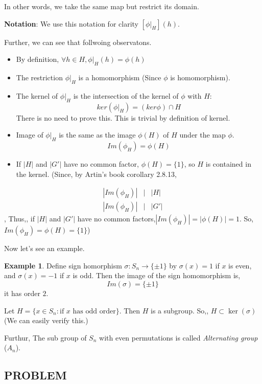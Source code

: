 \documentclass[
]{book}
\providecommand{\tightlist}{%
  \setlength{\itemsep}{0pt}\setlength{\parskip}{0pt}}
\theoremstyle{definition}
\theoremstyle{definition}
\newtheorem{example}{Example}[chapter]
\theoremstyle{definition}
\theoremstyle{definition}
\theoremstyle{remark}
\begin{document}
In other words, we take the same map but restrict its domain.

\textbf{Notation}: We use this notation for clarity \([\phi|_H](h)\).

Further, we can see that follwoing observatons.

\begin{itemize}
\tightlist
\item
  By definition, \(\forall h\in H,\phi|_H(h) = \phi(h)\)
\item
  The restriction \(\phi|_H\) is a homomorphism (Since \(\phi\) is homomorphism).
\item
  The kernel of \(\phi|_H\) is the intersection of the kernel of \(\phi\) with \(H\):
  \[ker(\phi|_H) = (ker\phi) \cap H\]
  There is no need to prove this. This is trivial by definition of kernel.
\item
  Image of \(\phi|_H\) is the same as the image \(\phi(H)\) of \(H\) under the map \(\phi\).
  \[Im(\phi_H)=\phi(H)\]
\item
  If \(|H|\) and \(|G'|\) have no common factor, \(\phi(H) = \{1\}\), so \(H\) is contained in the kernel.
  (Since, by Artin's book corollary 2.8.13,
\end{itemize}

\begin{eqnarray}
|Im(\phi_H)|&\biggr |&|H|\\
|Im(\phi_H)|&\biggr |& |G'|
\end{eqnarray}, Thus,, if \(|H|\) and \(|G'|\) have no common factors,\(|Im(\phi_H)|=|\phi(H)| =1.\) So, \(Im(\phi_H)=\phi(H)= \{1\}\))

Now let's see an example.

\begin{example}
\protect\hypertarget{exm:unnamed-chunk-24}{}\label{exm:unnamed-chunk-24}Define sign homorphism \(\sigma: S_n \to \{\pm 1\}\) by \(\sigma(x)=1\) if \(x\) is even, and \(\sigma (x)=−1\) if \(x\) is odd. Then the image of the sign homomorphism is,
\[Im(\sigma)=\{\pm 1\}\]
it has order \(2\).

Let \(H=\{x \in S_n : \text{if $x$ has odd order}\}\). Then \(H\) is a subgroup. So,, \(H \subset \ker(\sigma)\) (We can easily verify this.)

Furthur, The sub group of \(S_n\) with even permutations is called \emph{Alternating group} (\(A_n\)).
\end{example}

\hypertarget{problem}{%
\subsection{\texorpdfstring{\textbf{PROBLEM}}{PROBLEM}}\label{problem}}
\end{document}
